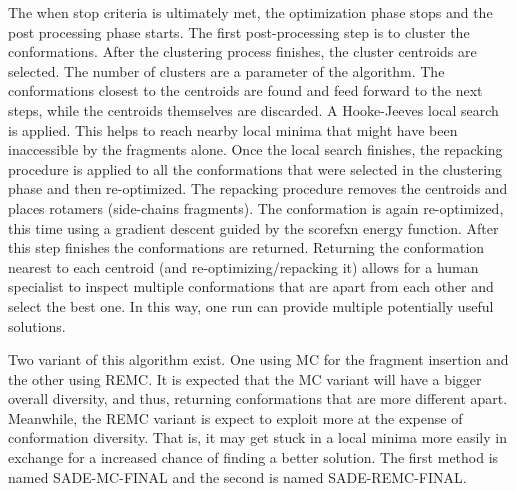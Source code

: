 The when stop criteria is ultimately met, the optimization phase stops and the
post processing phase starts. The first post-processing step is to cluster the
conformations. After the clustering process finishes, the cluster centroids are
selected. The number of clusters are a parameter of the algorithm.
The conformations closest to the centroids are found and feed forward
to the next steps, while the centroids themselves are discarded. A Hooke-Jeeves
local search is applied. This helps to reach nearby local minima that might have
been inaccessible by the fragments alone. Once the local search finishes, the
repacking procedure is applied to all the conformations that were selected in
the clustering phase and then re-optimized. The repacking procedure removes the
centroids and places rotamers (side-chains fragments). The conformation is again
re-optimized, this time using a gradient descent guided by the scorefxn energy
function. After this step finishes the conformations are returned. Returning
the conformation nearest to each centroid (and re-optimizing/repacking it) allows
for a human specialist to inspect multiple conformations that are apart from
each other and select the best one. In this way, one run can provide multiple
potentially useful solutions.

Two variant of this algorithm exist. One using \ac{MC} for the fragment insertion
and the other using \ac{REMC}. It is expected that the \ac{MC} variant will have
a bigger overall diversity, and thus, returning conformations that are more
different apart. Meanwhile, the \ac{REMC} variant is expect to exploit more at
the expense of conformation diversity. That is, it may get stuck in a local
minima more easily in exchange for a increased chance of finding a better solution.
The first method is named SADE-MC-FINAL and the second is named SADE-REMC-FINAL.
